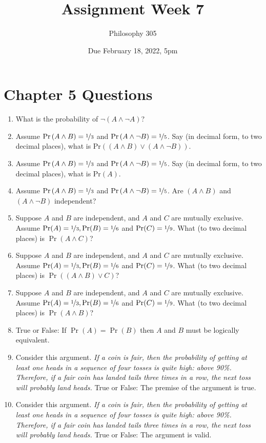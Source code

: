 \documentclass[
  11pt,
]{article}
\title{Assignment Week 7}
\author{Philosophy 305}
\date{Due February 18, 2022, 5pm}
\providecommand{\tightlist}{%
  \setlength{\itemsep}{0pt}\setlength{\parskip}{0pt}}
\begin{document}
\maketitle

\hypertarget{chapter-5-questions}{%
\section{Chapter 5 Questions}\label{chapter-5-questions}}

\begin{enumerate}
\def\labelenumi{\arabic{enumi}.}
\tightlist
\item
  What is the probability of \(\neg\left(A\wedge\neg A\right)\)?
\item
  Assume \(\text{Pr}\left(A\wedge B\right)=\nicefrac{1}{3}\) and
  \(\text{Pr}\left(A\wedge\neg B\right)=\nicefrac{1}{5}\). Say (in
  decimal form, to two decimal places), what is
  \(\text{Pr}\left(\left(A\wedge B\right)\vee\left(A\wedge\neg B\right)\right)\).
\item
  Assume \(\text{Pr}\left(A\wedge B\right)=\nicefrac{1}{3}\) and
  \(\text{Pr}\left(A\wedge\neg B\right)=\nicefrac{1}{5}\). Say (in
  decimal form, to two decimal places), what is
  \(\text{Pr}\left(A\right)\).
\item
  Assume \(\text{Pr}\left(A\wedge B\right)=\nicefrac{1}{3}\) and
  \(\text{Pr}\left(A\wedge\neg B\right)=\nicefrac{1}{5}\). Are
  \(\left(A\wedge B\right)\) and \(\left(A\wedge\neg B\right)\)
  independent?
\item
  Suppose \(A\) and \(B\) are independent, and \(A\) and \(C\) are
  mutually exclusive. Assume
  \(\Pr(A) = \nicefrac{1}{3}, \Pr(B) = \nicefrac{1}{6}\) and
  \(\Pr(C) = \nicefrac{1}{9}\). What (to two decimal places) is
  \(\Pr(A \wedge C)\)?
\item
  Suppose \(A\) and \(B\) are independent, and \(A\) and \(C\) are
  mutually exclusive. Assume
  \(\Pr(A) = \nicefrac{1}{3}, \Pr(B) = \nicefrac{1}{6}\) and
  \(\Pr(C) = \nicefrac{1}{9}\). What (to two decimal places) is
  \(\Pr((A \wedge B) \vee C)\)?
\item
  Suppose \(A\) and \(B\) are independent, and \(A\) and \(C\) are
  mutually exclusive. Assume
  \(\Pr(A) = \nicefrac{1}{3}, \Pr(B) = \nicefrac{1}{6}\) and
  \(\Pr(C) = \nicefrac{1}{9}\). What (to two decimal places) is
  \(\Pr(A \wedge B)\)?
\item
  True or False: If \(\Pr(A) = \Pr(B)\) then \(A\) and \(B\) must be
  logically equivalent.
\item
  Consider this argument. \emph{If a coin is fair, then the probability
  of getting at least one heads in a sequence of four tosses is quite
  high: above 90\%. Therefore, if a fair coin has landed tails three
  times in a row, the next toss will probably land heads.} True or
  False: The premise of the argument is true.
\item
  Consider this argument. \emph{If a coin is fair, then the probability
  of getting at least one heads in a sequence of four tosses is quite
  high: above 90\%. Therefore, if a fair coin has landed tails three
  times in a row, the next toss will probably land heads.} True or
  False: The argument is valid.
\end{enumerate}
\end{document}
